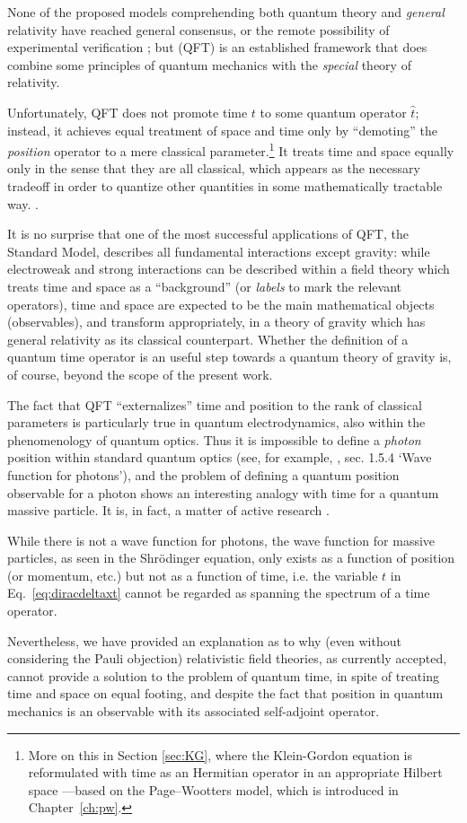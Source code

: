 None of the proposed models comprehending both quantum theory and \emph{general} relativity
have reached general consensus,
or the remote possibility of experimental verification \parencite{QGravIntro};
but  (QFT) is an established framework that does combine
some principles
of quantum mechanics with the \emph{special} theory of relativity.

Unfortunately, QFT does not promote time $t$ to some quantum operator $\hat{t}$;
instead, it achieves equal treatment of space and time only by
``demoting'' the \emph{position} operator to a mere classical parameter.\footnote{
  More on this in Section \ref{sec:KG}, where the Klein-Gordon equation is reformulated
  with time as an Hermitian operator in an appropriate Hilbert space
  ---based on the Page--Wootters model, which is introduced in Chapter~\ref{ch:pw}.
}
It treats time and space equally only in the sense that they are all classical,
which appears as the necessary tradeoff in order to quantize other quantities
in some mathematically tractable way. \parencite[\s I.1]{SrednickiQFT}.

It is no surprise that one of the most successful applications
of QFT, the Standard Model, describes all fundamental interactions except gravity:
while electroweak and strong interactions can be described within a field theory
which treats time and space as a ``background'' (or \emph{labels} to mark the relevant operators),
time and space are expected to be the main mathematical objects (observables),
and transform appropriately,
in a theory of gravity
which has general relativity as its classical counterpart.
Whether the definition of a quantum time operator is an useful step towards
a quantum theory of gravity is, of course, beyond the scope of the present work.

The fact that QFT ``externalizes'' time and position to the rank of classical parameters
is particularly true in quantum electrodynamics, also within the
phenomenology of quantum optics.
Thus it is impossible to define a \emph{photon} position
within standard quantum optics (see, for example, \cite{ScullyZubairy}, sec. 1.5.4 `Wave function for photons'),
and the problem of defining a quantum position observable for a photon
shows an interesting analogy with time for a quantum massive particle.
It is, in fact, a matter of active research \parencite{HawtonPhotonPosition, Hawton2019}.

While there is not a wave function for photons, the wave function for massive particles,
as seen in the Shr\"{o}dinger equation, only exists as a function of position (or momentum, etc.)
but not as a function of time,
i.e. the variable $t$ in Eq.~\eqref{eq:diracdeltaxt}
cannot be regarded as spanning the spectrum of a time operator.

Nevertheless, we have provided an explanation as to why (even without considering the Pauli objection)
relativistic field theories, as currently accepted, cannot provide a solution
to the problem of quantum time, in spite of treating time and space on equal footing,
and despite the fact that position in quantum mechanics is an observable
with its associated self-adjoint operator.
